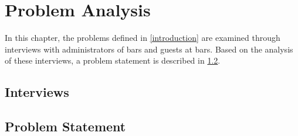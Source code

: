 \chapter{Problem Analysis}
\label{cha:problem_analysis}

In this chapter, the problems defined in \cref{introduction} are
examined through interviews with administrators of bars and guests at
bars. Based on the analysis of these interviews, a problem statement
is described in \cref{ProblemStatement}.

\section{Interviews}






\section{Problem Statement}
\label{ProblemStatement}

